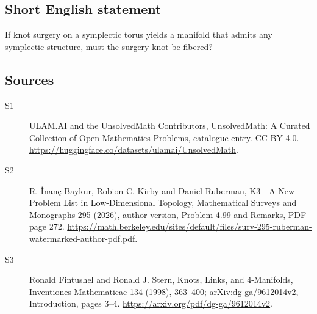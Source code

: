 \documentclass[11pt]{article}
\begin{document}
\subsection{Short English statement}
If knot surgery on a symplectic torus yields a manifold that admits any symplectic structure, must the surgery knot be fibered?
\subsection{Sources}
\begin{description}
\item[\hypertarget{source:statement:1}{S1}] ULAM.AI and the UnsolvedMath Contributors, UnsolvedMath: A Curated Collection of Open Mathematics Problems, catalogue entry. CC BY 4.0. \url{https://huggingface.co/datasets/ulamai/UnsolvedMath}.
\item[\hypertarget{source:statement:2}{S2}] R. İnanç Baykur, Robion C. Kirby and Daniel Ruberman, K3—A New Problem List in Low-Dimensional Topology, Mathematical Surveys and Monographs 295 (2026), author version, Problem 4.99 and Remarks, PDF page 272. \url{https://math.berkeley.edu/sites/default/files/surv-295-ruberman-watermarked-author-pdf.pdf}.
\item[\hypertarget{source:statement:3}{S3}] Ronald Fintushel and Ronald J. Stern, Knots, Links, and 4-Manifolds, Inventiones Mathematicae 134 (1998), 363--400; arXiv:dg-ga/9612014v2, Introduction, pages 3--4. \url{https://arxiv.org/pdf/dg-ga/9612014v2}.
\end{description}
\label{end:statement}
\end{document}
